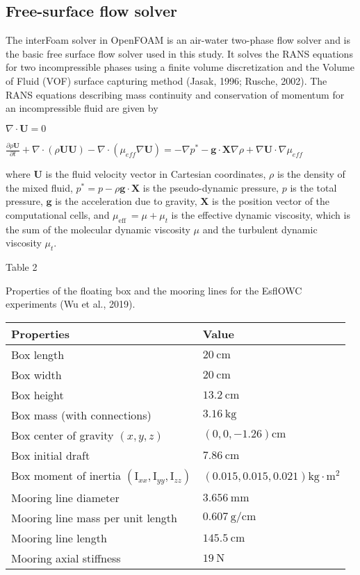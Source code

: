 \subsection{Free-surface flow solver}

The interFoam solver in OpenFOAM is an air-water two-phase flow solver and is the basic free surface flow solver used in this study. It solves the RANS equations for two incompressible phases using a finite volume discretization and the Volume of Fluid (VOF) surface capturing method (Jasak, 1996; Rusche, 2002). The RANS equations describing mass continuity and conservation of momentum for an incompressible fluid are given by

$\nabla \cdot \mathbf{U}=0$

$\frac{\partial \rho \mathbf{U}}{\partial t}+\nabla \cdot(\rho \mathbf{U} \mathbf{U})-\nabla \cdot\left(\mu_{e f f} \nabla \mathbf{U}\right)=-\nabla p^{*}-\mathbf{g} \cdot \mathbf{X} \nabla \rho+\nabla \mathbf{U} \cdot \nabla \mu_{e f f}$

where $\mathbf{U}$ is the fluid velocity vector in Cartesian coordinates, $\rho$ is the density of the mixed fluid, $p^{*}=p-\rho \mathbf{g} \cdot \mathbf{X}$ is the pseudo-dynamic pressure, $p$ is the total pressure, $\mathbf{g}$ is the acceleration due to gravity, $\mathbf{X}$ is the position vector of the computational cells, and $\mu_{\text {eff }}=\mu+\mu_{t}$ is the effective dynamic viscosity, which is the sum of the molecular dynamic viscosity $\mu$ and the turbulent dynamic viscosity $\mu_{t}$.

Table 2

Properties of the floating box and the mooring lines for the EsflOWC experiments (Wu et al., 2019).

\begin{tabular}{ll}
\hline Properties & Value \\
\hline Box length & $20 \mathrm{~cm}$ \\
Box width & $20 \mathrm{~cm}$ \\
Box height & $13.2 \mathrm{~cm}$ \\
Box mass (with connections) & $3.16 \mathrm{~kg}$ \\
Box center of gravity $(x, y, z)$ & $(0,0,-1.26) \mathrm{cm}$ \\
Box initial draft & $7.86 \mathrm{~cm}$ \\
Box moment of inertia $\left(\mathrm{I}_{x x}, \mathrm{I}_{y y}, \mathrm{I}_{z z}\right)$ & $(0.015,0.015,0.021) \mathrm{kg} \cdot \mathrm{m}^{2}$ \\
Mooring line diameter & $3.656 \mathrm{~mm}$ \\
Mooring line mass per unit length & $0.607 \mathrm{~g} / \mathrm{cm}$ \\
Mooring line length & $145.5 \mathrm{~cm}$ \\
Mooring axial stiffness & $19 \mathrm{~N}$ \\
\hline
\end{tabular}

